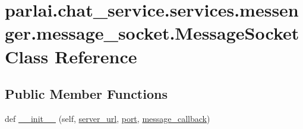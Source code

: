 \hypertarget{classparlai_1_1chat__service_1_1services_1_1messenger_1_1message__socket_1_1MessageSocket}{}\section{parlai.\+chat\+\_\+service.\+services.\+messenger.\+message\+\_\+socket.\+Message\+Socket Class Reference}
\label{classparlai_1_1chat__service_1_1services_1_1messenger_1_1message__socket_1_1MessageSocket}
\subsection*{Public Member Functions}
\begin{DoxyCompactItemize}
\item 
def \hyperlink{classparlai_1_1chat__service_1_1services_1_1messenger_1_1message__socket_1_1MessageSocket_a1bf9d1059a684a1e0a7dde6fa869ac53}{\+\_\+\+\_\+init\+\_\+\+\_\+} (self, \hyperlink{classparlai_1_1chat__service_1_1services_1_1messenger_1_1message__socket_1_1MessageSocket_af20fb3369fc09726dd136f7bcc3dc959}{server\+\_\+url}, \hyperlink{classparlai_1_1chat__service_1_1services_1_1messenger_1_1message__socket_1_1MessageSocket_ad3796fb1d859ec94a6c7b5669bd8b4a5}{port}, \hyperlink{classparlai_1_1chat__service_1_1services_1_1messenger_1_1message__socket_1_1MessageSocket_a8466c47481c63f872108b57ef0387c2c}{message\+\_\+callback})
\end{DoxyCompactItemize}
